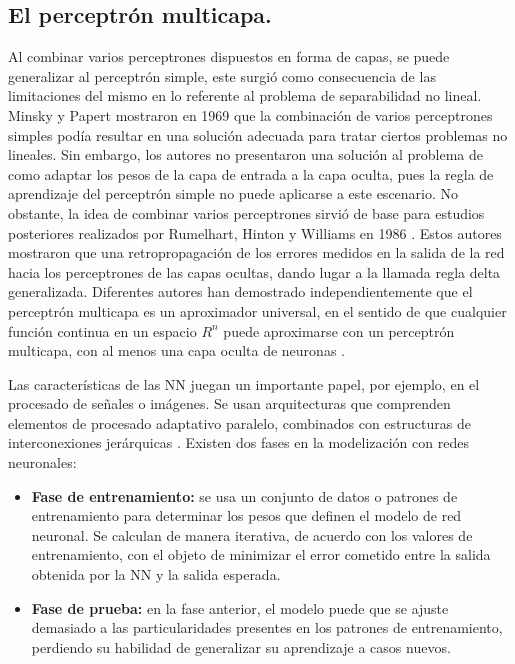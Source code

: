 \documentclass[12pt,letterpaper,oneside,openright]{book}
\begin{document}
	
	\subsection{El perceptrón multicapa.}
	Al combinar varios perceptrones dispuestos en forma de capas, se puede generalizar al perceptrón simple, este surgió como consecuencia de las limitaciones del mismo en lo referente al problema de separabilidad no lineal. Minsky y Papert mostraron en 1969 que la combinación de varios perceptrones simples podía resultar en una solución adecuada para tratar ciertos problemas no lineales. Sin embargo, los autores no presentaron una solución al problema de como adaptar los pesos de la capa de entrada a la capa oculta, pues la regla de aprendizaje del perceptrón simple no puede aplicarse a este escenario. No obstante, la idea de combinar varios perceptrones sirvió de base para estudios posteriores realizados por Rumelhart, Hinton y Williams en 1986 \cite{percepMulti}. Estos autores mostraron que una retropropagación de los errores medidos en la salida de la red hacia los perceptrones de las capas ocultas, dando lugar a la llamada regla delta generalizada. Diferentes autores han demostrado independientemente que el perceptrón multicapa es un aproximador universal, en el sentido de que cualquier función continua en un espacio $R^n$ puede aproximarse con un perceptrón multicapa, con al menos una capa oculta de neuronas \cite{stephani}.
 
 	Las características de las NN juegan un importante papel, por ejemplo, en el procesado de señales o imágenes. Se usan arquitecturas que comprenden elementos de procesado adaptativo paralelo, combinados con estructuras de interconexiones jerárquicas \cite{percepMulti}. Existen dos fases en la modelización con redes neuronales:
 	\begin{itemize}
 		\item \textbf{Fase de entrenamiento:} se usa un conjunto de datos o patrones de entrenamiento para determinar los pesos que definen el modelo de red neuronal. Se calculan de manera iterativa, de acuerdo con los valores de entrenamiento, con el objeto de minimizar el error cometido entre la salida obtenida por la NN y la salida esperada.
 		\item \textbf{Fase de prueba:} en la fase anterior, el modelo puede que se ajuste demasiado a las particularidades presentes en los patrones de entrenamiento, perdiendo su habilidad de generalizar su aprendizaje a casos nuevos.
 	\end{itemize}
 	
\end{document}
